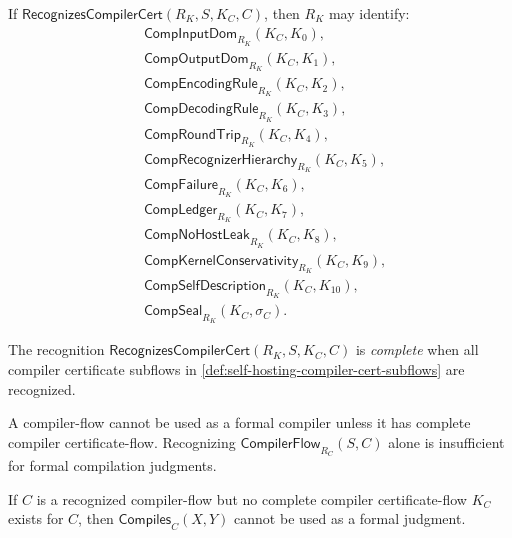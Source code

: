 \begin{definition}
\label{def:self-hosting-compiler-cert-subflows}
If $\mathsf{RecognizesCompilerCert}(R_K,S,K_C,C)$, then $R_K$ may identify:
$$
\begin{aligned}
  &\mathsf{CompInputDom}_{R_K}(K_C,K_0),\\
  &\mathsf{CompOutputDom}_{R_K}(K_C,K_1),\\
  &\mathsf{CompEncodingRule}_{R_K}(K_C,K_2),\\
  &\mathsf{CompDecodingRule}_{R_K}(K_C,K_3),\\
  &\mathsf{CompRoundTrip}_{R_K}(K_C,K_4),\\
  &\mathsf{CompRecognizerHierarchy}_{R_K}(K_C,K_5),\\
  &\mathsf{CompFailure}_{R_K}(K_C,K_6),\\
  &\mathsf{CompLedger}_{R_K}(K_C,K_7),\\
  &\mathsf{CompNoHostLeak}_{R_K}(K_C,K_8),\\
  &\mathsf{CompKernelConservativity}_{R_K}(K_C,K_9),\\
  &\mathsf{CompSelfDescription}_{R_K}(K_C,K_{10}),\\
  &\mathsf{CompSeal}_{R_K}(K_C,\sigma_C).
\end{aligned}
$$
\end{definition}

\begin{definition}
\label{def:self-hosting-complete-compiler-cert}
The recognition $\mathsf{RecognizesCompilerCert}(R_K,S,K_C,C)$ is \emph{complete} when all compiler certificate subflows in \autoref{def:self-hosting-compiler-cert-subflows} are recognized.
\end{definition}

\begin{principle}
\label{prin:self-hosting-no-compiler-without-cert}
A compiler-flow cannot be used as a formal compiler unless it has complete compiler certificate-flow. Recognizing $\mathsf{CompilerFlow}_{R_C}(S,C)$ alone is insufficient for formal compilation judgments.
\end{principle}

\begin{theorem}
\label{thm:self-hosting-uncertified-compiler-cannot-compile}
If $C$ is a recognized compiler-flow but no complete compiler certificate-flow $K_C$ exists for $C$, then $\mathsf{Compiles}_C(X,Y)$ cannot be used as a formal judgment.
\end{theorem}

